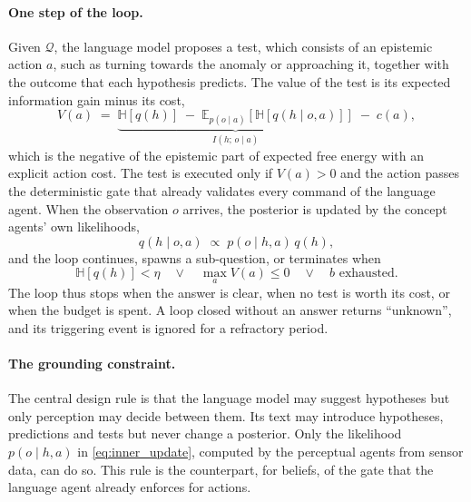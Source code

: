 \paragraph{One step of the loop.}
Given $\mathcal{Q}$, the language model proposes a test, which consists of an epistemic action $a$, such as turning
towards the anomaly or approaching it, together with the outcome that each hypothesis predicts. The value of the test
is its expected information gain minus its cost,
\begin{equation}
    V(a) \;=\; \underbrace{\mathbb{H}\!\left[q(h)\right] \;-\; \mathbb{E}_{p(o \mid a)}\!\left[ \mathbb{H}\!\left[q(h \mid o, a)\right]
    \right]}_{I(h;\,o \mid a)} \;-\; c(a),
    \label{eq:inner_value}
\end{equation}
which is the negative of the epistemic part of expected free energy with an explicit action cost. The test is
executed only if $V(a) > 0$ and the action passes the deterministic gate that already validates every command of
the language agent. When the observation $o$ arrives, the posterior is updated by the concept agents' own
likelihoods,
\begin{equation}
    q(h \mid o, a) \;\propto\; p(o \mid h, a)\, q(h),
    \label{eq:inner_update}
\end{equation}
and the loop continues, spawns a sub-question, or terminates when
\begin{equation}
    \mathbb{H}\!\left[q(h)\right] < \eta \quad\lor\quad \max_a V(a) \le 0 \quad\lor\quad b \text{ exhausted}.
    \label{eq:inner_stop}
\end{equation}
The loop thus stops when the answer is clear, when no test is worth its cost, or when the budget is spent. A loop
closed without an answer returns ``unknown'', and its triggering event is ignored for a refractory period.

\paragraph{The grounding constraint.}
The central design rule is that the language model may suggest hypotheses but only perception may decide between
them. Its text may introduce hypotheses, predictions and tests but never change a posterior. Only the likelihood $p(o \mid h, a)$ in \eqref{eq:inner_update}, computed by the perceptual agents from
sensor data, can do so. This rule is the counterpart, for beliefs, of the gate that the language agent already
enforces for actions.

